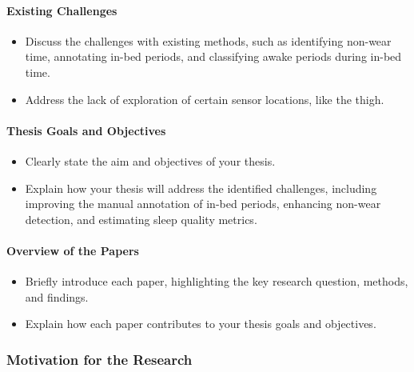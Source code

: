 \documentclass[
  10pt,
  letterpaper,
  DIV=11,
  numbers=noendperiod]{scrartcl}
\let\oldparagraph\paragraph
\renewcommand{\paragraph}[1]{\oldparagraph{#1}\mbox{}}
\providecommand{\tightlist}{%
  \setlength{\itemsep}{0pt}\setlength{\parskip}{0pt}}\usepackage{longtable,booktabs,array}
\begin{document}
\hypertarget{existing-challenges}{%
\paragraph{Existing Challenges}\label{existing-challenges}}

\begin{itemize}
\tightlist
\item
  Discuss the challenges with existing methods, such as identifying
  non-wear time, annotating in-bed periods, and classifying awake
  periods during in-bed time.
\item
  Address the lack of exploration of certain sensor locations, like the
  thigh.
\end{itemize}

\hypertarget{thesis-goals-and-objectives}{%
\paragraph{Thesis Goals and
Objectives}\label{thesis-goals-and-objectives}}

\begin{itemize}
\tightlist
\item
  Clearly state the aim and objectives of your thesis.
\item
  Explain how your thesis will address the identified challenges,
  including improving the manual annotation of in-bed periods, enhancing
  non-wear detection, and estimating sleep quality metrics.
\end{itemize}

\hypertarget{overview-of-the-papers}{%
\paragraph{Overview of the Papers}\label{overview-of-the-papers}}

\begin{itemize}
\item
  Briefly introduce each paper, highlighting the key research question,
  methods, and findings.
\item
  Explain how each paper contributes to your thesis goals and
  objectives.
\end{itemize}

\hypertarget{motivation-for-the-research}{%
\subsubsection{Motivation for the
Research}\label{motivation-for-the-research}}
\end{document}
